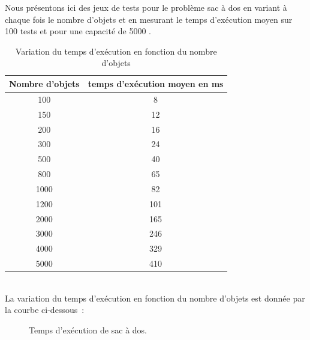 \documentclass[a4paper, 12pt]{article}
\begin{document}
Nous présentons ici des jeux de tests pour le problème sac à dos en variant à chaque fois le nombre d'objets et en mesurant le temps d'exécution moyen sur 100 tests et pour une capacité de 5000 .
\begin{table}[h!]
\centering
\begin{tabular}{|c|c|}
\hline
Nombre d'objets & temps d'exécution moyen en ms\\
\hline
100 & 8\\
\hline
150 & 12\\
\hline
200 & 16\\
\hline
300 & 24\\
\hline
500 & 40\\
\hline
800 & 65\\
\hline
1000 & 82\\
\hline
1200 & 101\\
\hline
2000 & 165\\
\hline
3000 & 246\\
\hline
 4000 & 329\\
\hline
  5000 & 410\\
\hline
\end{tabular}
\caption {Variation du temps d'exécution en fonction du nombre d'objets}
\end{table}\\
La variation du temps d'exécution en fonction du nombre d'objets est donnée par la courbe ci-dessous~:
\begin{figure}[h!]
\centering
{}
\caption{Temps d'exécution de sac à dos.}
\end{figure}
\end{document}
